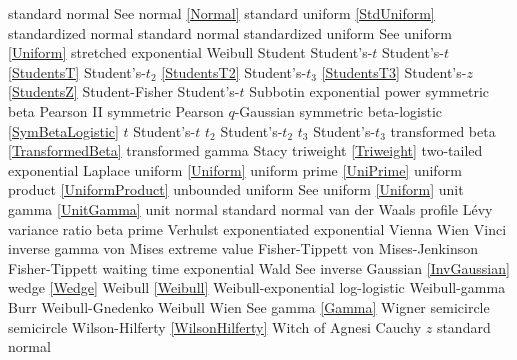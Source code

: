 standard normal 				\dotfill	See normal \eqref{Normal} 			\ncite	%
standard uniform				\dotfill	\eqref{StdUniform}					\ncite	%
standardized normal 			\dotfill	standard normal					\ncite	%
standardized uniform 			\dotfill	See uniform \eqref{Uniform}			\ncite	%
stretched exponential 			\dotfill	Weibull 								
Student							\dotfill 	Student's-$t$						\ncite	%
Student's-$t$					\dotfill	\eqref{StudentsT}  					\ncite	%
Student's-$t_2$					\dotfill	\eqref{StudentsT2}  					\ncite	%
Student's-$t_3$					\dotfill	\eqref{StudentsT3}  					\ncite	
Student's-$z$					\dotfill	\eqref{StudentsZ}					\ncite	%
Student-Fisher					\dotfill	Student's-$t$							%
Subbotin						\dotfill	exponential power					\ncite
symmetric beta					\dotfill	Pearson II							\ncite	%
symmetric Pearson				\dotfill	$q$-Gaussian						\mcite{\self}		%
symmetric beta-logistic			\dotfill	\eqref{SymBetaLogistic}				\mcite{\self}
%
$t$								\dotfill	Student's-$t$ 						\ncite	%
$t_2$							\dotfill	Student's-$t_2$ 					\ncite	%
$t_3$							\dotfill	Student's-$t_3$ 					\ncite
transformed beta				\dotfill	\eqref{TransformedBeta} 				\ncite	%
transformed gamma				\dotfill	Stacy 							\ncite %
triweight						\dotfill	\eqref{Triweight}						\ncite
two-tailed exponential			\dotfill	Laplace							\ncite %
%
uniform  						\dotfill	\eqref{Uniform}						\ncite 	%
uniform prime					\dotfill	\eqref{UniPrime}					\ncite	%
uniform product 				\dotfill	\eqref{UniformProduct}				\ncite 	%
%
unbounded uniform 				\dotfill	See uniform \eqref{Uniform}			\ncite	%
unit gamma						\dotfill	\eqref{UnitGamma} 					\ncite	%
unit normal						\dotfill	standard normal 					\ncite	%
%
van der Waals profile 			\dotfill	L\'{e}vy 							\ncite	%
variance ratio					\dotfill	beta prime 						\ncite	%
Verhulst						\dotfill	exponentiated exponential					 
Vienna 							\dotfill	Wien 							\ncite	%
Vinci 							\dotfill	inverse gamma 					\ncite	%
von Mises extreme value			\dotfill	Fisher-Tippett 						\ncite	%
von Mises-Jenkinson 			\dotfill	Fisher-Tippett 						\ncite	%
%
waiting time					\dotfill	exponential 						\ncite	%
Wald							\dotfill	See inverse Gaussian	 \eqref{InvGaussian}				\ncite	%
wedge							\dotfill	\eqref{Wedge}  						\ncite	%
Weibull 						\dotfill	\eqref{Weibull} 						\ncite	%
Weibull-exponential 			\dotfill	log-logistic 						\ncite	%
Weibull-gamma					\dotfill	Burr								\ncite	%
Weibull-Gnedenko				\dotfill	Weibull 							\ncite	%
Wien							\dotfill	See gamma \eqref{Gamma}			\ncite	%
Wigner semicircle				\dotfill	semicircle 						\ncite	%
Wilson-Hilferty					\dotfill	\eqref{WilsonHilferty} 				\ncite	%
Witch of Agnesi					\dotfill	Cauchy								%
%	
$z$								\dotfill	standard normal 					\ncite	%



\clearpage

